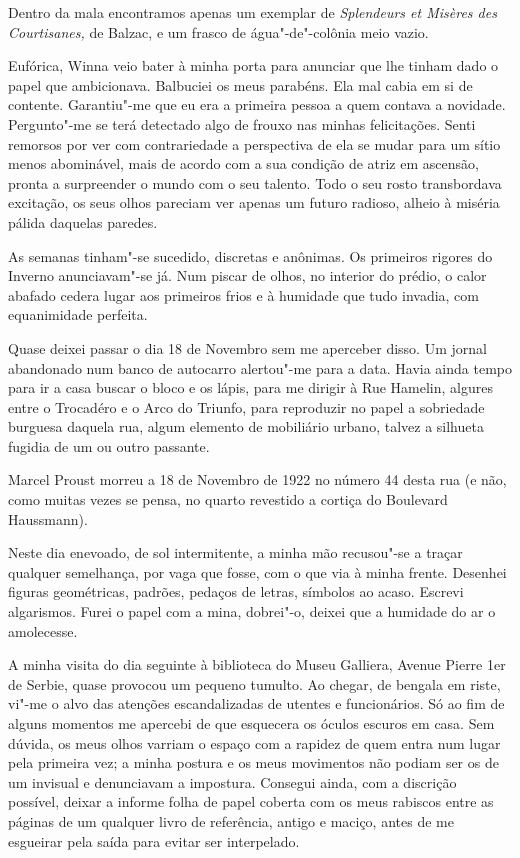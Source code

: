 Dentro da mala encontramos apenas um exemplar de \emph{Splendeurs et
Misères des Courtisanes, }de Balzac, e um frasco de água"-de"-colônia meio
vazio.

Eufórica, Winna veio bater à minha porta para anunciar que lhe tinham
dado o papel que ambicionava. Balbuciei os meus parabéns. Ela mal cabia
em si de contente. Garantiu"-me que eu era a primeira pessoa a quem contava a novidade. Pergunto"-me
se terá detectado algo de frouxo nas minhas felicitações. Senti remorsos
por ver com contrariedade a perspectiva de ela se mudar para um sítio
menos abominável, mais de acordo com a sua condição de atriz em
ascensão, pronta a surpreender o mundo com o seu talento. Todo o seu
rosto transbordava excitação, os seus olhos pareciam ver apenas um
futuro radioso, alheio à miséria pálida daquelas paredes.

As semanas tinham"-se sucedido, discretas e anônimas. Os primeiros
rigores do Inverno anunciavam"-se já. Num piscar de olhos, no interior do
prédio, o calor abafado cedera lugar aos primeiros frios e à humidade
que tudo invadia, com equanimidade perfeita.

Quase deixei passar o dia 18 de Novembro sem me aperceber disso. Um
jornal abandonado num banco de autocarro alertou"-me para a data. Havia
ainda tempo para ir a casa buscar o bloco e os lápis, para me dirigir
à Rue Hamelin, algures entre o Trocadéro e o Arco do Triunfo, para
reproduzir no papel a sobriedade burguesa daquela rua, algum elemento de
mobiliário urbano, talvez a silhueta fugidia de um ou outro passante.

Marcel Proust morreu a 18 de Novembro de 1922 no número 44 desta rua (e
não, como muitas vezes se pensa,
no quarto revestido a cortiça do Boulevard Haussmann).

Neste dia enevoado, de sol intermitente, a minha mão recusou"-se a traçar
qualquer semelhança, por vaga que fosse, com o que via à minha frente.
Desenhei figuras geométricas, padrões, pedaços de letras, símbolos ao
acaso. Escrevi algarismos. Furei o papel com a mina, dobrei"-o, deixei
que a humidade do ar o amolecesse.

A minha visita do dia seguinte à biblioteca do Museu Galliera, Avenue
Pierre 1er de Serbie, quase provocou um pequeno tumulto. Ao chegar, de
bengala em riste, vi"-me o alvo das atenções escandalizadas de utentes e
funcionários. Só ao fim de alguns momentos me apercebi de que esquecera
os óculos escuros em casa. Sem dúvida, os meus olhos varriam o espaço
com a rapidez de quem entra num lugar pela primeira vez; a minha postura
e os meus movimentos não podiam ser os de um invisual e denunciavam a
impostura. Consegui ainda, com a discrição possível, deixar a informe
folha de papel coberta com os meus rabiscos entre as páginas de um
qualquer livro de referência, antigo e maciço, antes de me esgueirar
pela saída para evitar ser interpelado.

